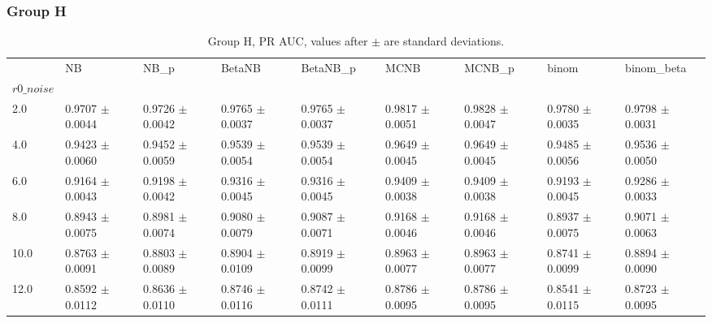 \subsubsection*{Group H}
\begin{table}[H]
\centering
\begin{adjustbox}{max width=\linewidth}
\begin{tabular}{lllllllll}
\toprule
 & NB & NB\_p & BetaNB & BetaNB\_p & MCNB & MCNB\_p & binom & binom\_beta \\
$r0\_noise$ &  &  &  &  &  &  &  &  \\
\midrule
2.0 & 0.9707 $\pm$ 0.0044 & 0.9726 $\pm$ 0.0042 & 0.9765 $\pm$ 0.0037 & 0.9765 $\pm$ 0.0037 & 0.9817 $\pm$ 0.0051 & 0.9828 $\pm$ 0.0047 & 0.9780 $\pm$ 0.0035 & 0.9798 $\pm$ 0.0031 \\
4.0 & 0.9423 $\pm$ 0.0060 & 0.9452 $\pm$ 0.0059 & 0.9539 $\pm$ 0.0054 & 0.9539 $\pm$ 0.0054 & 0.9649 $\pm$ 0.0045 & 0.9649 $\pm$ 0.0045 & 0.9485 $\pm$ 0.0056 & 0.9536 $\pm$ 0.0050 \\
6.0 & 0.9164 $\pm$ 0.0043 & 0.9198 $\pm$ 0.0042 & 0.9316 $\pm$ 0.0045 & 0.9316 $\pm$ 0.0045 & 0.9409 $\pm$ 0.0038 & 0.9409 $\pm$ 0.0038 & 0.9193 $\pm$ 0.0045 & 0.9286 $\pm$ 0.0033 \\
8.0 & 0.8943 $\pm$ 0.0075 & 0.8981 $\pm$ 0.0074 & 0.9080 $\pm$ 0.0079 & 0.9087 $\pm$ 0.0071 & 0.9168 $\pm$ 0.0046 & 0.9168 $\pm$ 0.0046 & 0.8937 $\pm$ 0.0075 & 0.9071 $\pm$ 0.0063 \\
10.0 & 0.8763 $\pm$ 0.0091 & 0.8803 $\pm$ 0.0089 & 0.8904 $\pm$ 0.0109 & 0.8919 $\pm$ 0.0099 & 0.8963 $\pm$ 0.0077 & 0.8963 $\pm$ 0.0077 & 0.8741 $\pm$ 0.0099 & 0.8894 $\pm$ 0.0090 \\
12.0 & 0.8592 $\pm$ 0.0112 & 0.8636 $\pm$ 0.0110 & 0.8746 $\pm$ 0.0116 & 0.8742 $\pm$ 0.0111 & 0.8786 $\pm$ 0.0095 & 0.8786 $\pm$ 0.0095 & 0.8541 $\pm$ 0.0115 & 0.8723 $\pm$ 0.0095 \\
\bottomrule
\end{tabular}

\end{adjustbox}
\caption{Group H, PR AUC, values after $\pm$ are standard deviations.}
\end{table}

